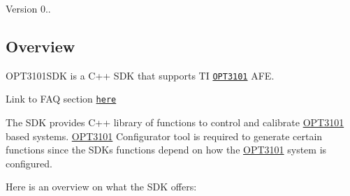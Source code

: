 Version 0..

\subsection*{Overview}

O\+P\+T3101\+S\+DK is a C++ S\+DK that supports TI \href{http://www.ti.com/product/OPT3101}{\tt O\+P\+T3101} A\+FE.

Link to F\+AQ section \href{#FAQ}{\tt here}

The S\+DK provides C++ library of functions to control and calibrate \mbox{\hyperlink{namespace_o_p_t3101}{O\+P\+T3101}} based systems. \mbox{\hyperlink{namespace_o_p_t3101}{O\+P\+T3101}} Configurator tool is required to generate certain functions since the S\+DK\textquotesingle{}s functions depend on how the \mbox{\hyperlink{namespace_o_p_t3101}{O\+P\+T3101}} system is configured.

Here is an overview on what the S\+DK offers\+:


